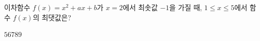 이차함수 $f(x)=x^2+ax+b$가 $x=2$에서 최솟값 $-1$을 가질 때, $1\le x\le 5$에서 함수 $f(x)$의 최댓값은? 
\begin{choices32}{$5$}{$6$}{$7$}{$8$}{$9$}\end{choices32}
